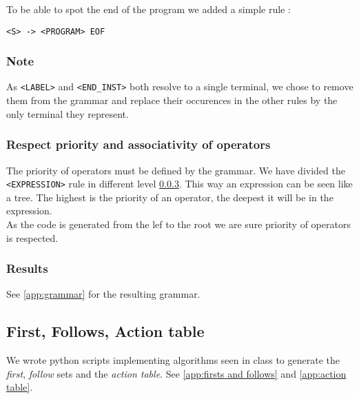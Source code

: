 To be able to spot the end of the program we added a simple rule :

\begin{center}
\begin{BVerbatim}[commandchars=\\\{\}]
<S> -> <PROGRAM> EOF
\end{BVerbatim}
\end{center}

\subsubsection{Note}

As \verb!<LABEL>! and \verb!<END_INST>! both resolve to a single terminal, we chose to remove them from the grammar and replace their occurences in the other rules by the only terminal they represent.

\subsubsection{Respect priority and associativity of operators}

The priority of operators must be defined by the grammar. We have divided the \verb!<EXPRESSION>! rule in different level \ref{expression}. This way an expression can be seen like a tree. The highest is the priority of an operator, the deepest it will be in the expression.\\ As the code is generated from the lef to the root we are sure priority of operators is respected.  



\subsubsection{Results}
\label{expression}
See \ref{app:grammar} for the resulting grammar.

\subsection{First, Follows, Action table}

We wrote python scripts implementing algorithms seen in class to generate the \emph{first}, \emph{follow} sets and the \emph{action table}. See \ref{app:firsts and follows} and \ref{app:action table}.

